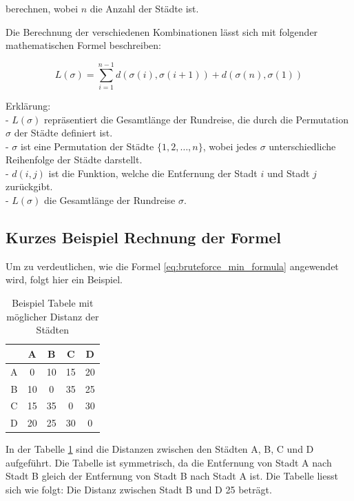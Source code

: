berechnen, wobei \(n\) die Anzahl der Städte ist.

Die Berechnung der verschiedenen Kombinationen lässt sich mit folgender 
mathematischen Formel beschreiben:

\begin{equation}
    \label{eq:bruteforce_min_formula}
    L(\sigma) = \sum_{i=1}^{n-1} d(\sigma(i), \sigma(i+1)) + d(\sigma(n), \sigma(1))
\end{equation}

Erklärung:\\
- \( L(\sigma) \)  repräsentiert die Gesamtlänge der Rundreise, die durch 
die Permutation \( \sigma \) der Städte definiert ist.\\
- \( \sigma \) ist eine Permutation der Städte \( \{1, 2, \ldots, n\} \),
wobei jedes \( \sigma \) unterschiedliche Reihenfolge der Städte darstellt.\\
- \( d(i, j) \) ist die Funktion, welche die Entfernung der Stadt \( i \) und 
Stadt \( j \) zurückgibt.\\
- \( L(\sigma) \) die Gesamtlänge der Rundreise \( \sigma \).\\

\subsection{Kurzes Beispiel Rechnung der Formel
    \label{variationsprinzip_algorithmen:section:bruteforce_calculate}}
Um zu verdeutlichen, wie die Formel \ref{eq:bruteforce_min_formula}
angewendet wird, folgt hier ein Beispiel.

\begin{table}[h]
    \centering
    \begin{tabular}{|c|c|c|c|c|}
        \hline
          & A  & B  & C  & D  \\ \hline
        A & 0  & 10 & 15 & 20 \\ \hline
        B & 10 & 0  & 35 & 25 \\ \hline
        C & 15 & 35 & 0  & 30 \\ \hline
        D & 20 & 25 & 30 & 0  \\ \hline
    \end{tabular}
    \caption{Beispiel Tabele mit möglicher Distanz der Städten}
    \label{tab:example_bruteforce_cities}
\end{table}

In der Tabelle \ref{tab:example_bruteforce_cities} sind die Distanzen 
zwischen den Städten A, B, C und D aufgeführt. Die Tabelle ist symmetrisch, 
da die Entfernung von Stadt A nach Stadt B gleich der Entfernung von 
Stadt B nach Stadt A ist.
Die Tabelle liesst sich wie folgt: Die Distanz zwischen Stadt B und D 25 beträgt.


